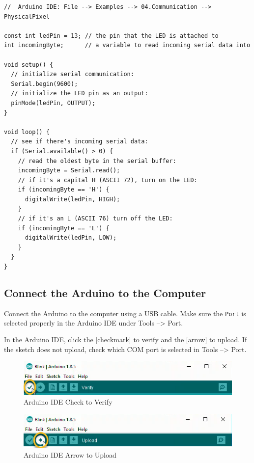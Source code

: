 \documentclass{book}
\makeatletter
\def\maxwidth{\ifdim\Gin@nat@width>\linewidth\linewidth
    \else\Gin@nat@width\fi}
\let\Oldincludegraphics\includegraphics
\renewcommand{\includegraphics}[1]{\Oldincludegraphics[width=.8\maxwidth]{#1}}
\makeatother
\begin{document}
    
        \begin{lstlisting}
//  Arduino IDE: File --> Examples --> 04.Communication --> PhysicalPixel

const int ledPin = 13; // the pin that the LED is attached to
int incomingByte;      // a variable to read incoming serial data into

void setup() {
  // initialize serial communication:
  Serial.begin(9600);
  // initialize the LED pin as an output:
  pinMode(ledPin, OUTPUT);
}

void loop() {
  // see if there's incoming serial data:
  if (Serial.available() > 0) {
    // read the oldest byte in the serial buffer:
    incomingByte = Serial.read();
    // if it's a capital H (ASCII 72), turn on the LED:
    if (incomingByte == 'H') {
      digitalWrite(ledPin, HIGH);
    }
    // if it's an L (ASCII 76) turn off the LED:
    if (incomingByte == 'L') {
      digitalWrite(ledPin, LOW);
    }
  }
}
\end{lstlisting}
    




    
        \subsection{Connect the Arduino to the
Computer}\label{connect-the-arduino-to-the-computer}
    




    
        Connect the Arduino to the computer using a USB cable. Make sure the
\lstinline!Port! is selected properly in the Arduino IDE under Tools
--\textgreater{} Port.

In the Arduino IDE, click the {[}checkmark{]} to verify and the
{[}arrow{]} to upload. If the sketch does not upload, check which COM
port is selected in Tools --\textgreater{} Port.

\begin{figure}
\centering
\includegraphics{images/Check_to_Verify.png}
\caption{Arduino IDE Check to Verify}
\end{figure}

\begin{figure}
\centering
\includegraphics{images/Arrow_to_Upload.png}
\caption{Arduino IDE Arrow to Upload}
\end{figure}
    
\end{document}
